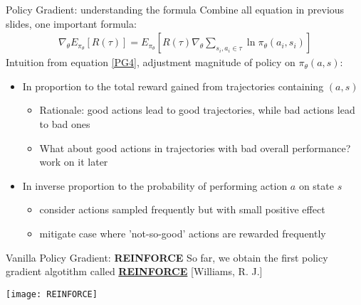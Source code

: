 \begin{frame}{Policy Gradient: understanding the formula}
    Combine all equation in previous slides, one important formula:
        \begin{equation}
            \label{PG4}
            \begin{split}
                \nabla_\theta E_{\pi_{\theta}}[R(\tau)] = E_{\pi_{\theta}}[R(\tau)\nabla_\theta\sum\limits_{s_i,a_i \in \tau}\ln\pi_\theta(a_i,s_i)]
            \end{split}
        \end{equation}
    Intuition from equation \ref{PG4}, adjustment magnitude of policy on $\pi_{\theta}(a,s)$:\vspace{0.2cm}
    \begin{itemize}
        \item In proportion to the total reward gained from trajectories containing $(a,s)$\vspace{0.2cm}
        \begin{itemize}
            \item Rationale: good actions lead to good trajectories, while bad actions lead to bad ones\vspace{0.2cm}
            \item What about good actions in trajectories with bad overall performance? work on it later\vspace{0.2cm}
        \end{itemize}\vspace{0.2cm}
        \item In inverse proportion to the probability of performing action $a$ on state $s$\vspace{0.2cm}
        \begin{itemize}
            \item consider actions sampled frequently but with small positive effect\vspace{0.2cm}
            \item mitigate case where 'not-so-good' actions are rewarded frequently\vspace{0.2cm}
        \end{itemize}
    \end{itemize}
\end{frame}


\begin{frame}{Vanilla Policy Gradient: \textbf{REINFORCE}}
    So far, we obtain the first policy gradient algotithm called \href{http://www-anw.cs.umass.edu/~barto/courses/cs687/williams92simple.pdf}{\textbf{REINFORCE}} \textcolor{CUHKgreen}{\footnotesize[Williams, R. J.]}
    \begin{center}\texttt{[image: REINFORCE]}\end{center}
\end{frame}

